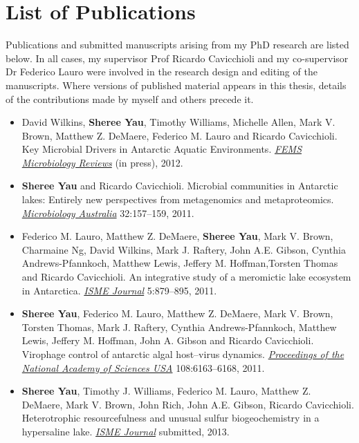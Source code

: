 \chapter*{List of Publications}
Publications and submitted manuscripts arising from my PhD research are listed below.
In all cases, my supervisor Prof Ricardo Cavicchioli and my co-supervisor Dr Federico Lauro were
involved in the research design and editing of the manuscripts.
Where versions of published material appears in this thesis, details of the contributions made by myself and others precede it.

\begin{itemize}

\item David Wilkins, \textbf{Sheree Yau}, Timothy Williams, Michelle Allen, Mark V. Brown, Matthew Z. DeMaere, Federico M. Lauro and Ricardo Cavicchioli.
Key Microbial Drivers in Antarctic Aquatic Environments.
\emph{\underline{FEMS Microbiology Reviews}}
(in press), 2012.

\item \textbf{Sheree Yau} and Ricardo Cavicchioli. 
Microbial communities in Antarctic lakes: Entirely new perspectives from metagenomics and metaproteomics. 
\emph{\underline{Microbiology Australia}} 
32:157--159, 2011.

\item Federico M. Lauro, Matthew Z. DeMaere, \textbf{Sheree Yau}, Mark V. Brown, Charmaine Ng, David Wilkins, Mark J. Raftery, John A.E. Gibson, Cynthia Andrews-Pfannkoch, Matthew Lewis, Jeffery M. Hoffman,Torsten Thomas and Ricardo Cavicchioli. 
An integrative study of a meromictic lake ecosystem in Antarctica. 
\emph{\underline{ISME Journal}}
5:879--895, 2011.

\item \textbf{Sheree Yau}, Federico M. Lauro, Matthew Z. DeMaere, Mark V. Brown, Torsten Thomas, 
Mark J. Raftery, Cynthia Andrews-Pfannkoch, Matthew Lewis, Jeffery M. Hoffman, John A. Gibson and 
Ricardo Cavicchioli. 
Virophage control of antarctic algal host--virus dynamics. 
\emph{\underline{Proceedings of the National Academy of Sciences USA}}
108:6163--6168, 2011.

\item \textbf{Sheree Yau}, Timothy J. Williams, Federico M. Lauro,  Matthew Z. DeMaere, Mark V. Brown, John Rich, 
John A.E. Gibson, Ricardo Cavicchioli. 
Heterotrophic resourcefulness and unusual sulfur biogeochemistry in a hypersaline lake.
\emph{\underline{ISME Journal}}
submitted, 2013.


\end{itemize}

